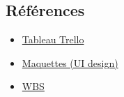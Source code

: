 \documentclass[
]{article}
\begin{document}
\hypertarget{ruxe9fuxe9rences}{%
\subsection{Références}\label{ruxe9fuxe9rences}}

\begin{itemize}
\item
  \href{https://trello.com/invite/b/QCUhh5sY/900fa738fc6c66193db04199e1248ae6/suivitransport}{Tableau
  Trello}
\item
  \href{https://whimsical.com/kdi-ux-design-J9PD866564ibwyMBwLHN9N}{Maquettes
  (UI design)}
\item
  \href{https://whimsical.com/wbs-kpi-9BDZ7oPFWEhvz9qQGoQEdL}{WBS}
\end{itemize}
\end{document}
